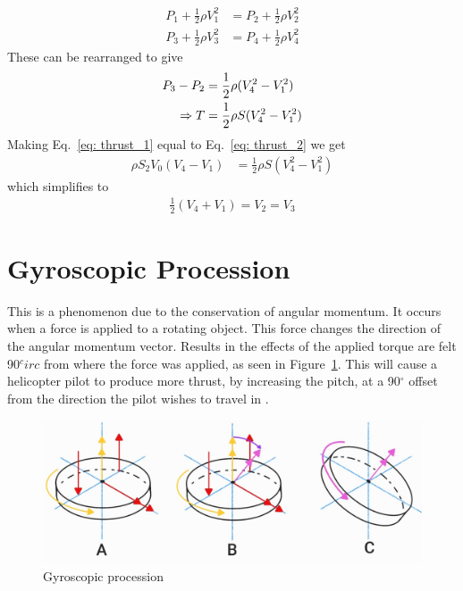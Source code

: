         \begin{align*}
           P_1 +\frac{1}{2}\rho V_1^2 &= P_2 +\frac{1}{2}\rho V_2^2 \\
           P_3 +\frac{1}{2}\rho V_3^2 &= P_4 +\frac{1}{2}\rho V_4^2 
        \end{align*}
        These can be rearranged to give
        \begin{align}
            P_3 - P_2 &= \frac{1}{2}\rho(V_4^2 - V_1^2) \notag\\
            \Rightarrow  T &= \frac{1}{2}\rho S(V_4^2 - V_1^2) \label{eq: thrust_2}
        \end{align}
        Making Eq.~\ref*{eq: thrust_1} equal to Eq.~\ref*{eq: thrust_2} we get
        \begin{align*}
            \rho S_2 V_0(V_4-V_1) &=\frac{1}{2}\rho S(V_4^2 - V_1^2)
        \end{align*} 
        which simplifies to
        \begin{align}
            \frac{1}{2}(V_4 + V_1) = V_2 = V_3
        \end{align}

        \section{Gyroscopic Procession}
            This is a phenomenon due to the conservation of angular momentum. It occurs when a force is applied to a rotating object. This force changes the direction of the angular momentum vector. Results in the effects of the applied torque are felt 90\(^circ\) from where the force was applied, as seen in Figure~\ref{fig: gyroscope_procession}. This will cause a helicopter pilot to produce more thrust, by increasing the pitch, at a 90\(^\circ\) offset from the direction the pilot wishes to travel in \citep{gyro}.
        \begin{figure}[H]
        \centering
        \includegraphics[width =\textwidth]{figs/Literature Review/Gyroscopic procession.jpg}
        \caption{Gyroscopic procession}
        \label{fig: gyroscope_procession}
\end{figure}